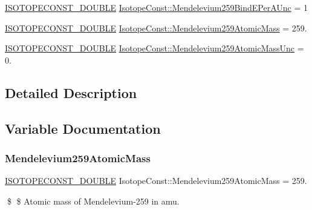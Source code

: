\begin{DoxyCompactItemize}
\item 
\mbox{\hyperlink{group___isotope_const-_macros_ga8f45a7272ce02c0b4c65c44636ed719a}{I\+S\+O\+T\+O\+P\+E\+C\+O\+N\+S\+T\+\_\+\+D\+O\+U\+B\+LE}} \mbox{\hyperlink{group___isotope_const-_mendelevium-_md259_ga1385872b377e463a5fcd5fb5ffbbddab}{Isotope\+Const\+::\+Mendelevium259\+Bind\+E\+Per\+A\+Unc}} = 1
\item 
\mbox{\hyperlink{group___isotope_const-_macros_ga8f45a7272ce02c0b4c65c44636ed719a}{I\+S\+O\+T\+O\+P\+E\+C\+O\+N\+S\+T\+\_\+\+D\+O\+U\+B\+LE}} \mbox{\hyperlink{group___isotope_const-_mendelevium-_md259_ga74cc3c9aa17bc50a38aa1ec10c330ee7}{Isotope\+Const\+::\+Mendelevium259\+Atomic\+Mass}} = 259.
\item 
\mbox{\hyperlink{group___isotope_const-_macros_ga8f45a7272ce02c0b4c65c44636ed719a}{I\+S\+O\+T\+O\+P\+E\+C\+O\+N\+S\+T\+\_\+\+D\+O\+U\+B\+LE}} \mbox{\hyperlink{group___isotope_const-_mendelevium-_md259_ga09e05f2d9b79d507b7991e83322b3810}{Isotope\+Const\+::\+Mendelevium259\+Atomic\+Mass\+Unc}} = 0.
\end{DoxyCompactItemize}


\subsection{Detailed Description}


\subsection{Variable Documentation}
\mbox{\label{group___isotope_const-_mendelevium-_md259_ga74cc3c9aa17bc50a38aa1ec10c330ee7}} 
\subsubsection{\texorpdfstring{Mendelevium259\+Atomic\+Mass}{Mendelevium259AtomicMass}}
{\footnotesize\ttfamily \mbox{\hyperlink{group___isotope_const-_macros_ga8f45a7272ce02c0b4c65c44636ed719a}{I\+S\+O\+T\+O\+P\+E\+C\+O\+N\+S\+T\+\_\+\+D\+O\+U\+B\+LE}} Isotope\+Const\+::\+Mendelevium259\+Atomic\+Mass = 259.}

\$ \$ Atomic mass of Mendelevium-\/259 in amu. \mbox{\label{group___isotope_const-_mendelevium-_md259_ga09e05f2d9b79d507b7991e83322b3810}} 

